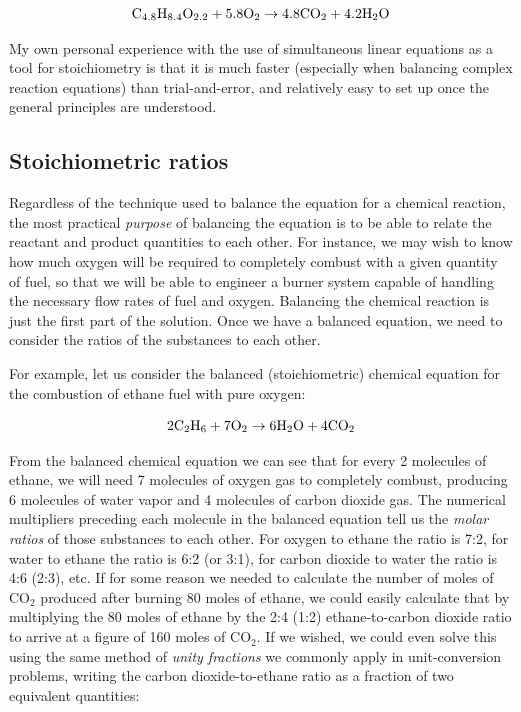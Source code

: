 $$\hbox{C}_{4.8}\hbox{H}_{8.4}\hbox{O}_{2.2} + \hbox{5.8O}_2 \to \hbox{4.8CO}_2 + \hbox{4.2H}_2\hbox{O}$$

My own personal experience with the use of simultaneous linear equations as a tool for stoichiometry is that it is much faster (especially when balancing complex reaction equations) than trial-and-error, and relatively easy to set up once the general principles are understood.








\filbreak
\subsection{Stoichiometric ratios}

Regardless of the technique used to balance the equation for a chemical reaction, the most practical \textit{purpose} of balancing the equation is to be able to relate the reactant and product quantities to each other.  For instance, we may wish to know how much oxygen will be required to completely combust with a given quantity of fuel, so that we will be able to engineer a burner system capable of handling the necessary flow rates of fuel and oxygen.  Balancing the chemical reaction is just the first part of the solution.  Once we have a balanced equation, we need to consider the ratios of the substances to each other.

\vskip 10pt

For example, let us consider the balanced (stoichiometric) chemical equation for the combustion of ethane fuel with pure oxygen:

$$\hbox{2C}_2\hbox{H}_6 + \hbox{7O}_2 \to \hbox{6H}_2\hbox{O} + \hbox{4CO}_2$$

From the balanced chemical equation we can see that for every 2 molecules of ethane, we will need 7 molecules of oxygen gas to completely combust, producing 6 molecules of water vapor and 4 molecules of carbon dioxide gas.  The numerical multipliers preceding each molecule in the balanced equation tell us the \textit{molar ratios} of those substances to each other.  For oxygen to ethane the ratio is 7:2, for water to ethane the ratio is 6:2 (or 3:1), for carbon dioxide to water the ratio is 4:6 (2:3), etc.  If for some reason we needed to calculate the number of moles of CO$_{2}$ produced after burning 80 moles of ethane, we could easily calculate that by multiplying the 80 moles of ethane by the 2:4 (1:2) ethane-to-carbon dioxide ratio to arrive at a figure of 160 moles of CO$_{2}$.  If we wished, we could even solve this using the same method of \textit{unity fractions} we commonly apply in unit-conversion problems, writing the carbon dioxide-to-ethane ratio as a fraction of two equivalent quantities: 

